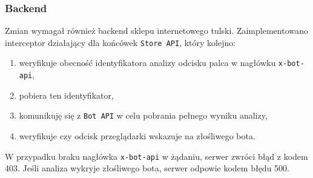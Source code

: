 \subsubsection{Backend}

Zmian wymagał również backend sklepu internetowego tulski.
Zaimplementowano interceptor działający dla końcówek \texttt{Store API}, który kolejno:
\begin{enumerate}
    \item weryfikuje obecność identyfikatora analizy odcisku palca w nagłówku \texttt{x-bot-api},
    \item pobiera ten identyfikator,
    \item komunikuję się z \texttt{Bot API} w celu pobrania pełnego wyniku analizy,
    \item weryfikuje czy odcisk przeglądarki wskazuje na złośliwego bota.
\end{enumerate}
W przypadku braku nagłówka \texttt{x-bot-api} w żądaniu, serwer zwróci błąd z kodem 403.
Jeśli analiza wykryje złośliwego bota, serwer odpowie kodem błędu 500.
